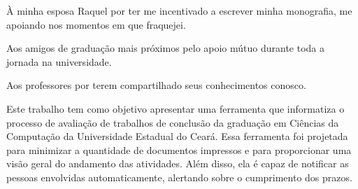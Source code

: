 \documentclass[pnumabnt,normaltoc,espacoumemeio,capchap]{abnt}
\begin{document}
\capa
\folhaderosto
\makecippage
\termodeaprovacao

À minha esposa Raquel por ter me incentivado a escrever minha monografia, me apoiando nos
momentos em que fraquejei.

Aos amigos de graduação mais próximos pelo apoio mútuo durante toda a jornada na universidade.

Aos professores por terem compartilhado seus conhecimentos conosco.
\pagebreak

\makeepigrafe
\tableofcontents
\listadefiguras
\listadetabelas

\begin{resumo}
\noindent
Este trabalho tem como objetivo apresentar uma ferramenta que informatiza
o processo de avaliação de trabalhos de conclusão da graduação em Ciências 
da Computação da Universidade Estadual do Ceará. Essa ferramenta foi projetada 
para minimizar a quantidade de documentos impressos e para proporcionar uma 
visão geral do andamento das atividades. Além disso, ela é capaz de notificar 
as pessoas envolvidas automaticamente, alertando sobre o cumprimento dos prazos.
\noindent
\palavraschave
\end{resumo}
\pagebreak





\appendix

\end{document}
